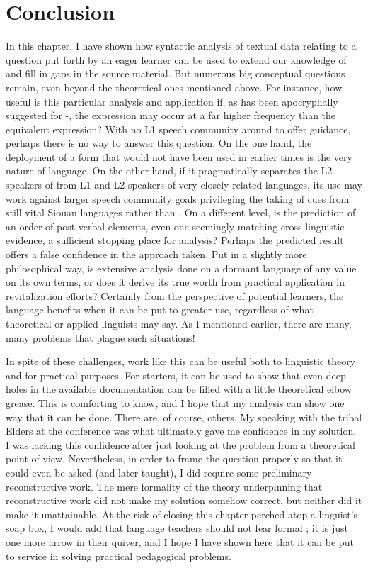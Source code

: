 \documentclass[output=paper]{LSP/langsci}
\begin{document}
\section{Conclusion}
	In this chapter, I have shown how syntactic analysis of textual data relating to a question put forth by an eager learner can be used to extend our knowledge of  and fill in gaps in the source material. But numerous big conceptual questions remain, even beyond the theoretical ones mentioned above. For instance, how useful is this particular analysis and application if, as has been apocryphally suggested for -, the  expression may occur at a far higher frequency than the equivalent  expression? With no L1 speech community around to offer guidance, perhaps there is no way to answer this question. On the one hand, the deployment of a form that would not have been used in earlier times is the very nature of language. On the other hand, if it pragmatically separates the L2 speakers of  from L1 and L2 speakers of very closely related languages, its use may work against larger speech community goals privileging the taking of cues from still vital Siouan languages rather than . On a different level, is the prediction of an order of post-verbal elements, even one seemingly matching cross-linguistic evidence, a sufficient stopping place for analysis? Perhaps the predicted result offers a false confidence in the approach taken. Put in a slightly more philosophical way, is extensive analysis done on a dormant language of any value on its own terms, or does it derive its true worth from practical application in revitalization efforts? Certainly from the perspective of potential learners, the language benefits when it can be put to greater use, regardless of what theoretical or applied linguists may say. As I mentioned earlier, there are many, many problems that plague such situations!
	
	In spite of these challenges, work like this can be useful both to linguistic theory and for practical purposes. For starters, it can be used to show that even deep holes in the available documentation can be filled with a little theoretical elbow grease. This is comforting to know, and I hope that my analysis can show one way that it can be done. There are, of course, others. My speaking with the tribal Elders at the conference was what ultimately gave me confidence in my solution. I was lacking this confidence after just looking at the problem from a theoretical point of view. Nevertheless, in order to frame the question properly so that it could even be asked (and later taught), I did require some preliminary reconstructive work. The mere formality of the theory underpinning that reconstructive work did not make my solution somehow correct, but neither did it make it unattainable. At the risk of closing this chapter perched atop a linguist's soap box, I would add that language teachers should not fear formal ; it is just one more arrow in their quiver, and I hope I have shown here that it can be put to service in solving practical pedagogical problems.
\end{document}
